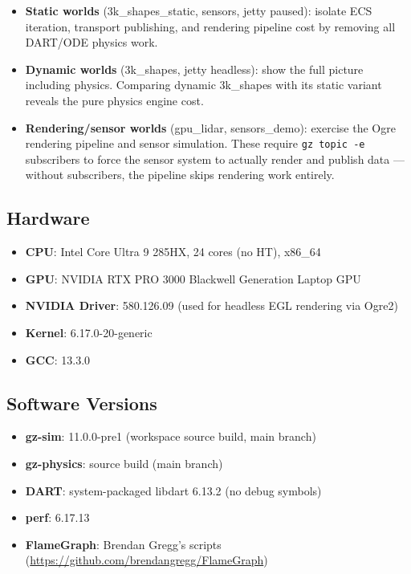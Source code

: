\documentclass[11pt, a4paper]{article}
\providecommand{\tightlist}{%
  \setlength{\itemsep}{0pt}\setlength{\parskip}{0pt}}
\begin{document}
\begin{itemize}
\tightlist
\item
  \textbf{Static worlds} (3k\_shapes\_static, sensors, jetty paused):
  isolate ECS iteration, transport publishing, and rendering pipeline
  cost by removing all DART/ODE physics work.
\item
  \textbf{Dynamic worlds} (3k\_shapes, jetty headless): show the full
  picture including physics. Comparing dynamic 3k\_shapes with its
  static variant reveals the pure physics engine cost.
\item
  \textbf{Rendering/sensor worlds} (gpu\_lidar, sensors\_demo): exercise
  the Ogre rendering pipeline and sensor simulation. These require
  \texttt{gz\ topic\ -e} subscribers to force the sensor system to
  actually render and publish data --- without subscribers, the pipeline
  skips rendering work entirely.
\end{itemize}

\hypertarget{hardware}{%
\subsection{Hardware}\label{hardware}}

\begin{itemize}
\tightlist
\item
  \textbf{CPU}: Intel Core Ultra 9 285HX, 24 cores (no HT), x86\_64
\item
  \textbf{GPU}: NVIDIA RTX PRO 3000 Blackwell Generation Laptop GPU
\item
  \textbf{NVIDIA Driver}: 580.126.09 (used for headless EGL rendering via Ogre2)
\item
  \textbf{Kernel}: 6.17.0-20-generic
\item
  \textbf{GCC}: 13.3.0
\end{itemize}

\hypertarget{software-versions}{%
\subsection{Software Versions}\label{software-versions}}

\begin{itemize}
\tightlist
\item
  \textbf{gz-sim}: 11.0.0-pre1 (workspace source build, main branch)
\item
  \textbf{gz-physics}: source build (main branch)
\item
  \textbf{DART}: system-packaged libdart 6.13.2 (no debug symbols)
\item
  \textbf{perf}: 6.17.13
\item
  \textbf{FlameGraph}: Brendan Gregg's scripts (\url{https://github.com/brendangregg/FlameGraph})
\end{itemize}
\end{document}

